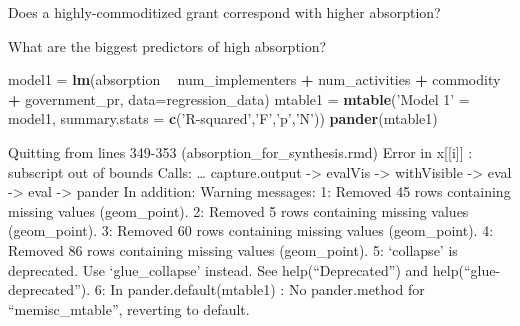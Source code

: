 \documentclass[ignorenonframetext,]{beamer}
\newenvironment{Shaded}{\begin{snugshade}}{\end{snugshade}}
\newcommand{\DataTypeTok}[1]{\textcolor[rgb]{0.13,0.29,0.53}{#1}}
\newcommand{\KeywordTok}[1]{\textcolor[rgb]{0.13,0.29,0.53}{\textbf{#1}}}
\newcommand{\NormalTok}[1]{#1}
\newcommand{\OperatorTok}[1]{\textcolor[rgb]{0.81,0.36,0.00}{\textbf{#1}}}
\newcommand{\StringTok}[1]{\textcolor[rgb]{0.31,0.60,0.02}{#1}}
\begin{document}
\begin{frame}{Does a highly-commoditized grant correspond with higher
absorption?}
\protect\hypertarget{does-a-highly-commoditized-grant-correspond-with-higher-absorption}{}

\end{frame}

\begin{frame}[fragile]{What are the biggest predictors of high
absorption?}
\protect\hypertarget{what-are-the-biggest-predictors-of-high-absorption}{}

\begin{Shaded}
\begin{Highlighting}[]
\NormalTok{model1 =}\StringTok{ }\KeywordTok{lm}\NormalTok{(absorption }\OperatorTok{~}\StringTok{ }\NormalTok{num_implementers }\OperatorTok{+}\StringTok{ }\NormalTok{num_activities }\OperatorTok{+}\StringTok{ }\NormalTok{commodity }\OperatorTok{+}\StringTok{ }\NormalTok{government_pr, }\DataTypeTok{data=}\NormalTok{regression_data)}
\NormalTok{mtable1 =}\StringTok{ }\KeywordTok{mtable}\NormalTok{(}\StringTok{'Model 1'}\NormalTok{ =}\StringTok{ }\NormalTok{model1, }\DataTypeTok{summary.stats =} \KeywordTok{c}\NormalTok{(}\StringTok{'R-squared'}\NormalTok{,}\StringTok{'F'}\NormalTok{,}\StringTok{'p'}\NormalTok{,}\StringTok{'N'}\NormalTok{))}
\KeywordTok{pander}\NormalTok{(mtable1)}
\end{Highlighting}
\end{Shaded}

Quitting from lines 349-353 (absorption\_for\_synthesis.rmd) Error in
x{[}{[}i{]}{]} : subscript out of bounds Calls: \ldots{} capture.output
-\textgreater{} evalVis -\textgreater{} withVisible -\textgreater{} eval
-\textgreater{} eval -\textgreater{} pander In addition: Warning
messages: 1: Removed 45 rows containing missing values (geom\_point). 2:
Removed 5 rows containing missing values (geom\_point). 3: Removed 60
rows containing missing values (geom\_point). 4: Removed 86 rows
containing missing values (geom\_point). 5: `collapse' is deprecated.
Use `glue\_collapse' instead. See help(``Deprecated'') and
help(``glue-deprecated''). 6: In pander.default(mtable1) : No
pander.method for ``memisc\_mtable'', reverting to default.

\end{frame}
\end{document}
